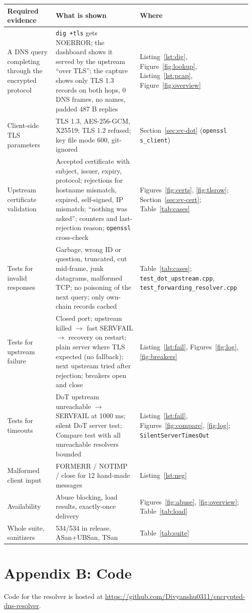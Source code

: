 \documentclass[11pt,a4paper]{article}
\newcommand{\code}[1]{\texttt{#1}}
\begin{document}
\begin{longtable}{@{}P{3.8cm}P{7.4cm}P{5.0cm}@{}}
\toprule
Required evidence & What is shown & Where \\
\midrule
\endhead
A DNS query completing through the encrypted protocol & \code{dig +tls} gets NOERROR; the dashboard shows it served by the upstream ``over TLS''; the capture shows only TLS 1.3 records on both hops, 0 DNS frames, no names, padded 487 B replies & Listing~\ref{lst:dig}, Figure~\ref{fig:lookup}, Listing~\ref{lst:pcap}, Figure~\ref{fig:overview} \\
\midrule
Client-side TLS parameters & TLS 1.3, AES-256-GCM, X25519; TLS 1.2 refused; key file mode 600, git-ignored & Section~\ref{sec:ev-dot} (\code{openssl s\_client}) \\
\midrule
Upstream certificate validation & Accepted certificate with subject, issuer, expiry, protocol; rejections for hostname mismatch, expired, self-signed, IP mismatch; ``nothing was asked''; counters and last-rejection reason; \code{openssl} cross-check & Figures~\ref{fig:certs}, \ref{fig:tlsrow}; Section~\ref{sec:ev-cert}; Table~\ref{tab:cases} \\
\midrule
Tests for invalid responses & Garbage, wrong ID or question, truncated, cut mid-frame, junk datagrams, malformed TCP; no poisoning of the next query; only own-chain records cached & Table~\ref{tab:cases}; \code{test\_dot\_upstream.cpp}, \code{test\_forwarding\_\allowbreak resolver.cpp} \\
\midrule
Tests for upstream failure & Closed port; upstream killed $\rightarrow$ fast SERVFAIL $\rightarrow$ recovery on restart; plain server where TLS expected (no fallback); next upstream tried after rejection; breakers open and close & Listing~\ref{lst:fail}, Figures~\ref{fig:log}, \ref{fig:breakers} \\
\midrule
Tests for timeouts & DoT upstream unreachable $\rightarrow$ SERVFAIL at 1000 ms; silent DoT server test; Compare test with all unreachable resolvers bounded & Listing~\ref{lst:fail}, Figures~\ref{fig:compare}, \ref{fig:log}; \code{SilentServerTimesOut} \\
\midrule
Malformed client input & FORMERR / NOTIMP / close for 12 hand-made messages & Listing~\ref{lst:neg} \\
\midrule
Availability & Abuse blocking, load results, exactly-once delivery & Figures~\ref{fig:abuse}, \ref{fig:overview}; Table~\ref{tab:load} \\
\midrule
Whole suite, sanitizers & 534/534 in release, ASan+UBSan, TSan & Table~\ref{tab:suite} \\
\bottomrule
\end{longtable}

\section{Appendix B: Code}

Code for the resolver is hosted at \url{https://github.com/Divyanshu0311/encrypted-dns-resolver}.
\end{document}
